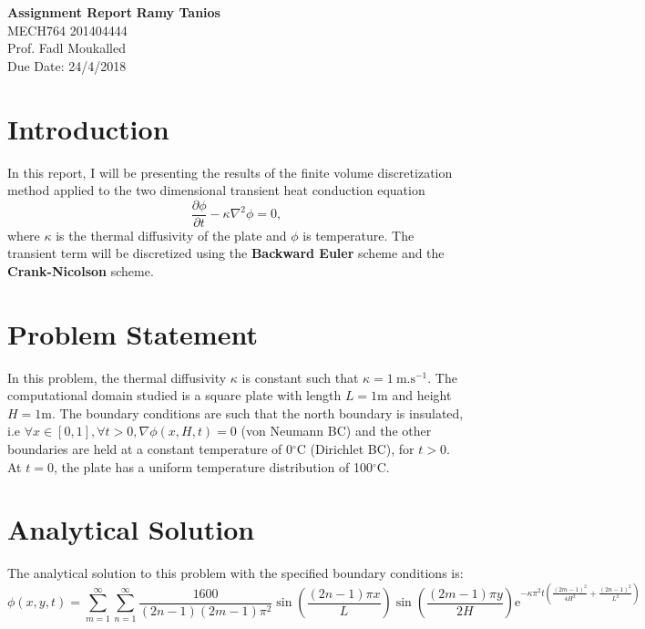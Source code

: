 \documentclass[a4paper, 11pt]{article}
\begin{document}
\noindent
\large\textbf{Assignment Report} \hfill \textbf{Ramy Tanios} \\
\normalsize MECH764 \hfill 201404444 \\
Prof. Fadl Moukalled \hfill \\ \hfill Due Date: 24/4/2018

\section*{Introduction}
In this report, I will be presenting the results of the finite volume discretization method applied to the two dimensional transient heat conduction equation
\begin{equation*} 
\frac{\partial\phi}{\partial t}-\kappa\nabla^2\phi=0,
\end{equation*}
 where $\kappa$ is the thermal diffusivity of the plate and $\phi$ is temperature. The transient term will be discretized using the \textbf{Backward Euler} scheme and the \textbf{Crank-Nicolson} scheme.
\section*{Problem Statement}
In this problem, the thermal diffusivity $\kappa$ is constant such that $\kappa=1 \ \text{m.s}^{-1}.$ The computational domain studied is a square plate with length $L=1\text{m}$ and height $H=1 \text{m}$. The boundary conditions are such that the north boundary is insulated, i.e $\forall x \in [0,1],\forall t>0, \nabla\phi(x,H,t)=0$ (von Neumann BC) and the other boundaries are held at a constant temperature of 0$^{\circ}$C (Dirichlet BC), for $t>0$. At $t=0$, the plate has a uniform temperature distribution of 100$^{\circ}$C.
\section*{Analytical Solution}
The analytical solution to this problem with the specified boundary conditions is: 
\begin{equation*}
\phi(x,y,t) = \sum_{m=1}^{\infty}\sum_{n=1}^{\infty} \frac{1600}{(2n-1)(2m-1)\pi^2} \sin(\frac{(2n-1)\pi x}{L})\sin(\frac{(2m-1)\pi y}{2H}) \mathrm{e}^{-\kappa\pi^2t(\frac{(2m-1)^2}{4H^2}+\frac{(2n-1)^2}{L^2})}
\end{equation*}
\end{document}
